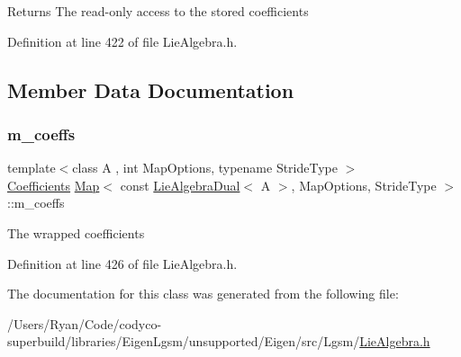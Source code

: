 \begin{DoxyReturn}{Returns}
The read-\/only access to the stored coefficients 
\end{DoxyReturn}


Definition at line 422 of file Lie\+Algebra.\+h.



\subsection{Member Data Documentation}
\hypertarget{class_map_3_01const_01_lie_algebra_dual_3_01_a_01_4_00_01_map_options_00_01_stride_type_01_4_a309ca6ad9fa9ab55a7ec4cc08f136404}{}\label{class_map_3_01const_01_lie_algebra_dual_3_01_a_01_4_00_01_map_options_00_01_stride_type_01_4_a309ca6ad9fa9ab55a7ec4cc08f136404} 
\subsubsection{\texorpdfstring{m\+\_\+coeffs}{m\_coeffs}}
{\footnotesize\ttfamily template$<$class A , int Map\+Options, typename Stride\+Type $>$ \\
\hyperlink{class_map_3_01const_01_lie_algebra_dual_3_01_a_01_4_00_01_map_options_00_01_stride_type_01_4_ae2a817b2902e4bf4f79a40724c8c9341}{Coefficients} \hyperlink{class_map_3_01const_01_lie_algebra_dual_3_01_a_01_4_00_01_map_options_00_01_stride_type_01_4_a3733e2160ea4f13268b2b3e34b33d7c7}{Map}$<$ const \hyperlink{class_lie_algebra_dual}{Lie\+Algebra\+Dual}$<$ A $>$, Map\+Options, Stride\+Type $>$\+::m\+\_\+coeffs\hspace{0.3cm}{\ttfamily [protected]}}

The wrapped coefficients 

Definition at line 426 of file Lie\+Algebra.\+h.



The documentation for this class was generated from the following file\+:\begin{DoxyCompactItemize}
\item 
/\+Users/\+Ryan/\+Code/codyco-\/superbuild/libraries/\+Eigen\+Lgsm/unsupported/\+Eigen/src/\+Lgsm/\hyperlink{_lie_algebra_8h}{Lie\+Algebra.\+h}\end{DoxyCompactItemize}
